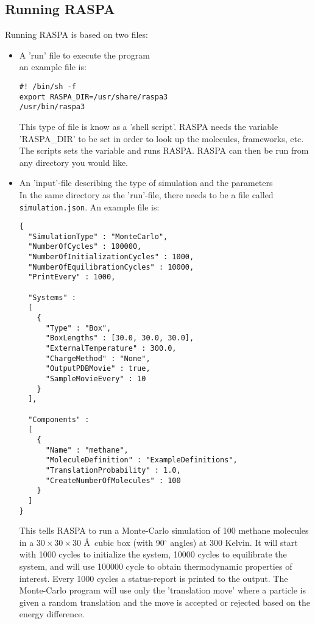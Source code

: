 \subsection{Running RASPA\label{Introduction: running RASPA}}
Running RASPA is based on two files:
\begin{itemize}
 \item{A 'run' file to execute the program}\\
  an example file is:
\begin{verbatim}
#! /bin/sh -f
export RASPA_DIR=/usr/share/raspa3
/usr/bin/raspa3
\end{verbatim}
  This type of file is know as a 'shell script'. RASPA needs the variable 'RASPA\_DIR' to be set in order
  to look up the molecules, frameworks, etc. The scripts sets the variable and runs RASPA. RASPA can then be run
  from any directory you would like.
 \item{An 'input'-file describing the type of simulation and the parameters}\\
  In the same directory as the 'run'-file, there needs to be a file called \verb+simulation.json+. An example file is:
\begin{verbatim}
{
  "SimulationType" : "MonteCarlo",
  "NumberOfCycles" : 100000,
  "NumberOfInitializationCycles" : 1000,
  "NumberOfEquilibrationCycles" : 10000,
  "PrintEvery" : 1000,

  "Systems" :
  [
    {
      "Type" : "Box",
      "BoxLengths" : [30.0, 30.0, 30.0],
      "ExternalTemperature" : 300.0,
      "ChargeMethod" : "None",
      "OutputPDBMovie" : true,
      "SampleMovieEvery" : 10
    }
  ],

  "Components" :
  [
    {
      "Name" : "methane",
      "MoleculeDefinition" : "ExampleDefinitions",
      "TranslationProbability" : 1.0,
      "CreateNumberOfMolecules" : 100
    }
  ]
}
\end{verbatim}
  This tells RASPA to run a Monte-Carlo simulation of 100 methane molecules in a $30\times30\times30$ \AA\ cubic box (with 90$^\circ$ angles)
  at 300 Kelvin. It will start with 1000 cycles to initialize the system,
    10000 cycles to equilibrate the system, and will use 100000 cycle to obtain thermodynamic properties
  of interest. Every 1000 cycles a status-report is printed to the output. The Monte-Carlo program will use only the 'translation move'
  where a particle is given a random translation and the move is accepted or rejected based on the energy difference.
  \end{itemize}


